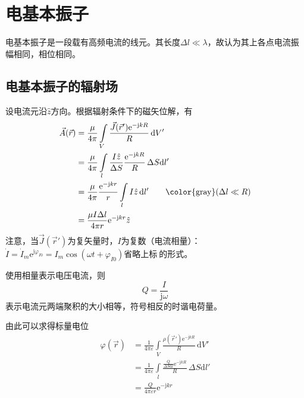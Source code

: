 \section{电基本振子}

    电基本振子是一段载有高频电流的线元。其长度$\Delta  l\ll \lambda$，故认为其上各点电流振幅相同，相位相同。

    \subsection{电基本振子的辐射场}
    设电流元沿$\hat{z}$方向。根据辐射条件下的磁矢位解，有
    \begin{equation}
        \begin{aligned}
            \vec{A}(\vec{r})&=\frac{\mu}{4\pi}\int\limits_{V}\frac{\vec{J}(\vec{r}')\mathrm{e}^{-\mathrm{j}kR}}{R}\,\mathrm{d}V'\\
            &=\frac{\mu}{4\pi}\int\limits_{l}\frac{I\hat{z}}{\Delta S}\frac{\mathrm{e}^{-\mathrm{j}kR}}{R}\,\Delta S\mathrm{d}l'\\
            &=\frac{\mu}{4\pi}\frac{\mathrm{e}^{-\mathrm{j}kr}}{r}\int\limits_{l}I\hat{z}\,\mathrm{d}l'\qquad\mbox{\color{gray}$(\Delta l\ll R)$}\\
            &=\frac{\mu I \Delta l}{4\pi r}\mathrm{e}^{-\mathrm{j}kr}\hat{z}
        \end{aligned}
    \end{equation}
    注意，当$\vec{J}(\vec{r}')$为复矢量时，$I$为复数（电流相量）：$\dot{I}=\dot{I}_m \mathrm{e}^{\mathrm{j}\varphi_{I0}}=I_m\cos(\omega t+\varphi_{I0})$省略上标$\dot{~}$的形式。

    使用相量表示电压电流，则
    \begin{equation}
        Q=\frac{I}{\mathrm{j}\omega}
    \end{equation}
    表示电流元两端聚积的大小相等，符号相反的时谐电荷量。

    {\color{gray} 由此可以求得标量电位
    \begin{equation}
        \begin{aligned}
            \varphi(\vec{r})
            &=\frac{1}{4\pi \varepsilon}\int\limits_{V}\frac{\rho(\vec{r}')\mathrm{e}^{-\mathrm{j}kR}}{R}\,\mathrm{d}V'\\
            &=\frac{1}{4\pi \varepsilon}\int\limits_{l}\frac{\frac{Q}{\Delta S \mathrm{d}l}\mathrm{e}^{-\mathrm{j}kR}}{R}\, \Delta S\mathrm{d}l'\\
            &=\frac{Q}{4\pi \varepsilon r}\mathrm{e}^{-\mathrm{j}kr}
        \end{aligned}
    \end{equation}
    }

